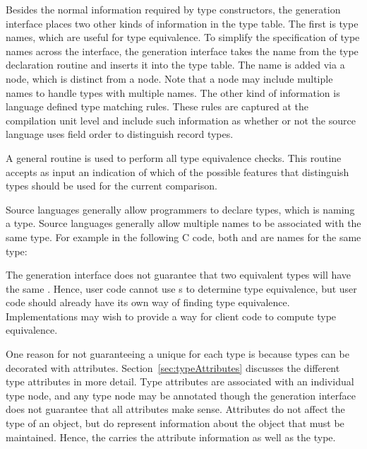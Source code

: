 Besides the normal information required by type constructors, the
generation interface places two other kinds of information in the type
table.  The first is type names, which are useful for type
equivalence.  To simplify the specification of type names across the
interface, the generation interface takes the name from the type
declaration routine and inserts it into the type table.  The name is
added via a  node, which is distinct from a
 node.  Note that a  node may
include multiple names to handle types with multiple names.  The other
kind of information is language defined type matching rules.  These
rules are captured at the compilation unit level and include such
information as whether or not the source language uses field order to
distinguish record types.

 A general routine is used to perform all
type equivalence checks.  This routine accepts as input an indication
of which of the possible features that distinguish types should be
used for the current comparison.

Source languages generally allow programmers to declare types, which
is naming a type.  Source languages generally allow multiple names to
be associated with the same type.  For example in the following C
code, both  and  are names for the same type:
\begin{center}
\begin{minipage}{2.0in}\end{minipage}
\end{center}

The generation interface does not guarantee that two equivalent types
will have the same .  Hence, user code cannot use
s to determine type equivalence, but user code should
already have its own way of finding type equivalence.  Implementations
may wish to provide a way for client code to compute type equivalence.

One reason for not guaranteeing a unique  for each type is
because types can be decorated with attributes.
Section~\ref{sec:typeAttributes} discusses the different type
attributes in more detail.  Type attributes are associated with an
individual type node, and any type node may be annotated though the
generation interface does not guarantee that all attributes make
sense.  Attributes do not affect the type of an object, but do
represent information about the object that must be maintained.
Hence, the  carries the attribute information as well as
the type.

